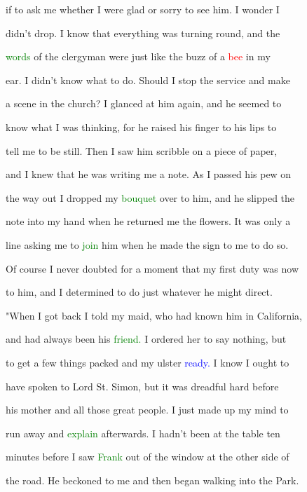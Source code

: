  if to ask me whether I were \textcolor{BurntOrange}{glad} or sorry to see him. I wonder I

 didn't drop. I know that everything was turning round, and the

 \textcolor{green}{words} of the clergyman were just like the \textcolor{BurntOrange}{buzz} of a \textcolor{red}{bee} in my

 ear. I didn't know what to do. Should I stop the service and make

 a scene in the \textcolor{BurntOrange}{church?} I glanced at him again, and he seemed to

 know what I was thinking, for he raised his finger to his lips to

 tell me to be still. Then I saw him scribble on a piece of paper,

 and I knew that he was writing me a note. As I passed his pew on

 the way out I dropped my \textcolor{green}{bouquet} over to him, and he \textcolor{BurntOrange}{slipped} the

 note into my hand when he returned me the flowers. It was only a

 line asking me to \textcolor{green}{join} him when he made the sign to me to do so.

 Of course I never \textcolor{BurntOrange}{doubted} for a moment that my first duty was now

 to him, and I determined to do just whatever he might direct.



 "When I got back I told my maid, who had known him in California,

 and had always been his \textcolor{green}{friend.} I ordered her to say nothing, but

 to get a few things packed and my ulster \textcolor{blue}{ready.} I know I ought to

 have spoken to \textcolor{BurntOrange}{Lord} St. Simon, but it was \textcolor{BurntOrange}{dreadful} hard before

 his \textcolor{BurntOrange}{mother} and all those great people. I just made up my mind to

 run away and \textcolor{green}{explain} afterwards. I hadn't been at the table ten

 minutes before I saw \textcolor{green}{Frank} out of the window at the other side of

 the road. He beckoned to me and then began walking into the Park.

